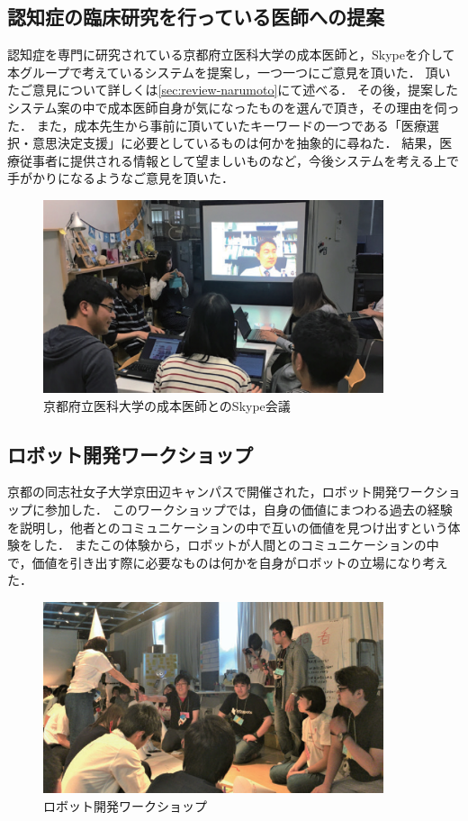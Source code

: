 \documentclass[../report]{subfiles}
\begin{document}
\subsection{認知症の臨床研究を行っている医師への提案}
認知症を専門に研究されている京都府立医科大学の成本医師と，Skypeを介して本グループで考えているシステムを提案し，一つ一つにご意見を頂いた．
頂いたご意見について詳しくは\ref{sec:review-narumoto}にて述べる．
その後，提案したシステム案の中で成本医師自身が気になったものを選んで頂き，その理由を伺った．
また，成本先生から事前に頂いていたキーワードの一つである「医療選択・意思決定支援」に必要としているものは何かを抽象的に尋ねた．
結果，医療従事者に提供される情報として望ましいものなど，今後システムを考える上で手がかりになるようなご意見を頂いた．
\begin{figure}[htbp]
    \begin{center}
        \includegraphics[width=10cm]{imgs/ninchisyo-kaigi.png}
        \caption{京都府立医科大学の成本医師とのSkype会議}
        \label{fig:ninchisyo-kaigi}
    \end{center}
\end{figure}

\subsection{ロボット開発ワークショップ}
京都の同志社女子大学京田辺キャンパスで開催された，ロボット開発ワークショップに参加した．
このワークショップでは，自身の価値にまつわる過去の経験を説明し，他者とのコミュニケーションの中で互いの価値を見つけ出すという体験をした．
またこの体験から，ロボットが人間とのコミュニケーションの中で，価値を引き出す際に必要なものは何かを自身がロボットの立場になり考えた．
\begin{figure}[htbp]
    \begin{center}
        \includegraphics[width=10cm]{imgs/ninchisyo-ws.png}
        \caption{ロボット開発ワークショップ}
        \label{fig:ninchisyo-ws}
    \end{center}
\end{figure}
\end{document}

